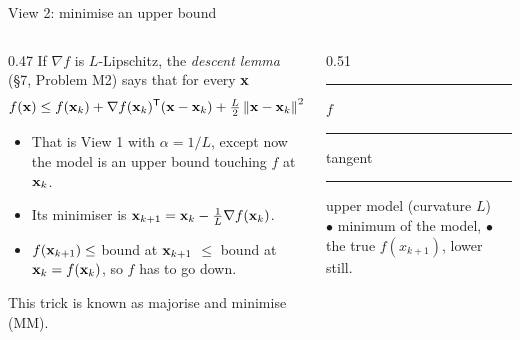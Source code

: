 \begin{frame}{View 2: minimise an upper bound}
  \begin{columns}[T]
    \begin{column}{0.47\textwidth}
      \small
      If $\nabla f$ is $L$-Lipschitz, the \emph{descent lemma} (\S7, Problem M2) says that for every $\mathbf{x}$
      \[
        f(\mathbf{x}) \le f(\mathbf{x}_k) + \nabla f(\mathbf{x}_k)^{\mathsf T}(\mathbf{x}-\mathbf{x}_k) + \tfrac L2\left\lVert \mathbf{x}-\mathbf{x}_k \right\rVert^2 .
      \]
      \begin{itemize}\footnotesize
        \item That is View 1 with $\alpha = 1/L$, except now the model is an \alert{upper bound} touching $f$ at $\mathbf{x}_k$.
        \item Its minimiser is $\mathbf{x}_{k+1} = \mathbf{x}_k - \tfrac1L\nabla f(\mathbf{x}_k)$.
        \item $f(\mathbf{x}_{k+1}) \le$ bound at $\mathbf{x}_{k+1}$ $\le$ bound at $\mathbf{x}_k = f(\mathbf{x}_k)$, so $f$ \alert{has to go down}.
      \end{itemize}
      \footnotesize\textcolor{mGrey}{This trick is known as majorise and minimise (MM).}
    \end{column}
    \begin{column}{0.51\textwidth}
      \centering
      

      \scriptsize
      \textcolor{mInk}{\rule[2pt]{10pt}{1.8pt}} $f$ \quad
      \textcolor{mBlue}{\rule[2pt]{10pt}{1pt}} tangent \quad
      \textcolor{mOrange}{\rule[2pt]{10pt}{1.2pt}} upper model (curvature $L$)\\
      \textcolor{mOrange}{$\bullet$} minimum of the model, \quad \textcolor{mGreen}{$\bullet$} the true $f(x_{k+1})$, lower still.
    \end{column}
  \end{columns}
\end{frame}

